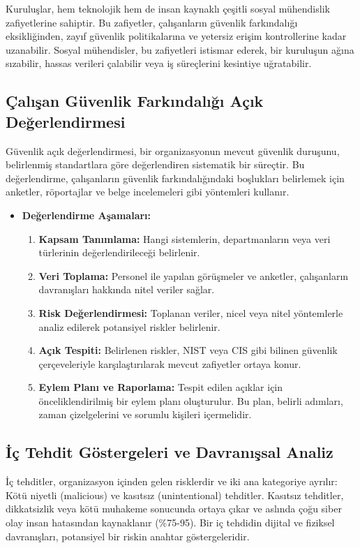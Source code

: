 Kuruluşlar, hem teknolojik hem de insan kaynaklı çeşitli sosyal mühendislik zafiyetlerine sahiptir. Bu zafiyetler, çalışanların güvenlik farkındalığı eksikliğinden, zayıf güvenlik politikalarına ve yetersiz erişim kontrollerine kadar uzanabilir. Sosyal mühendisler, bu zafiyetleri istismar ederek, bir kuruluşun ağına sızabilir, hassas verileri çalabilir veya iş süreçlerini kesintiye uğratabilir.

\subsection{Çalışan Güvenlik Farkındalığı Açık Değerlendirmesi}

Güvenlik açık değerlendirmesi, bir organizasyonun mevcut güvenlik duruşunu, belirlenmiş standartlara göre değerlendiren sistematik bir süreçtir. Bu değerlendirme, çalışanların güvenlik farkındalığındaki boşlukları belirlemek için anketler, röportajlar ve belge incelemeleri gibi yöntemleri kullanır.
\begin{itemize}
    \item \textbf{Değerlendirme Aşamaları:}
    \begin{enumerate}
        \item \textbf{Kapsam Tanımlama:} Hangi sistemlerin, departmanların veya veri türlerinin değerlendirileceği belirlenir.
        \item \textbf{Veri Toplama:} Personel ile yapılan görüşmeler ve anketler, çalışanların davranışları hakkında nitel veriler sağlar.
        \item \textbf{Risk Değerlendirmesi:} Toplanan veriler, nicel veya nitel yöntemlerle analiz edilerek potansiyel riskler belirlenir.
        \item \textbf{Açık Tespiti:} Belirlenen riskler, NIST veya CIS gibi bilinen güvenlik çerçeveleriyle karşılaştırılarak mevcut zafiyetler ortaya konur.
        \item \textbf{Eylem Planı ve Raporlama:} Tespit edilen açıklar için önceliklendirilmiş bir eylem planı oluşturulur. Bu plan, belirli adımları, zaman çizelgelerini ve sorumlu kişileri içermelidir.
    \end{enumerate}
\end{itemize}

\subsection{İç Tehdit Göstergeleri ve Davranışsal Analiz}

İç tehditler, organizasyon içinden gelen risklerdir ve iki ana kategoriye ayrılır: Kötü niyetli (malicious) ve kasıtsız (unintentional) tehditler. Kasıtsız tehditler, dikkatsizlik veya kötü muhakeme sonucunda ortaya çıkar ve aslında çoğu siber olay insan hatasından kaynaklanır (\%75-95). Bir iç tehdidin dijital ve fiziksel davranışları, potansiyel bir riskin anahtar göstergeleridir.

